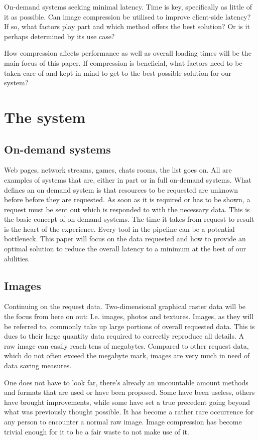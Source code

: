 \documentclass[11pt,a4paper]{report}
\begin{document}
On-demand systems seeking minimal latency. Time is key, specifically as little of it as possible. Can image compression be utilised to improve client-side latency? If so, what factors play part and which method offers the best solution? Or is it perhaps determined by its use case?

How compression affects performance as well as overall loading times will be the main focus of this paper. If compression is beneficial, what factors need to be taken care of and kept in mind to get to the best possible solution for our system?

\section{The system}

\subsection{On-demand systems}

Web pages, network streams, games, chats rooms, the list goes on. All are examples of systems that are, either in part or in full on-demand systems. What defines an on demand system is that resources to be requested are unknown before before they are requested. As soon as it is required or has to be shown, a request must be sent out which is responded to with the necessary data. This is the basic concept of on-demand systems. The time it takes from request to result is the heart of the experience. Every tool in the pipeline can be a potential bottleneck. This paper will focus on the data requested and how to provide an optimal solution to reduce the overall latency to a minimum at the best of our abilities.

\subsection{Images}

Continuing on the request data. Two-dimensional graphical raster data will be the focus from here on out: I.e. images, photos and textures. Images, as they will be referred to, commonly take up large portions of overall requested data. This is dues to their large quantity data required to correctly reproduce all details. A raw image can easily reach tens of megabytes. Compared to other request data, which do not often exceed the megabyte mark, images are very much in need of data saving measures.

One does not have to look far, there's already an uncountable amount methods and formats that are used or have been proposed. Some have been useless, others have brought improvements, while some have set a true precedent going beyond what was previously thought possible. It has become a rather rare occurrence for any person to encounter a normal raw image. Image compression has become trivial enough for it to be a fair waste to not make use of it.
\end{document}
